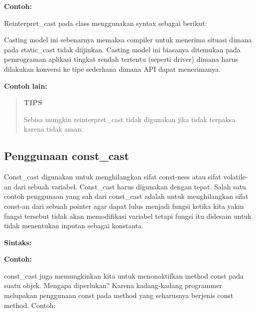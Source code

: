 

\textbf{Contoh:}



Reinterpret\_cast pada class menggunakan syntax sebagai berikut:



Casting model ini sebenarnya memaksa compiler untuk menerima situasi
dimana pada static\_cast tidak diijinkan. Casting model ini biasanya
ditemukan pada pemrograman aplikasi tingkat rendah tertentu (seperti
driver) dimana harus dilakukan konversi ke tipe sederhana dimana API
dapat menerimanya.



\textbf{Contoh lain:}



\begin{quotation}
{\LARGE {}} \textbf{TIPS}

Sebisa
mungkin reinterpret\_cast tidak digunakan jika tidak terpaksa karena
tidak aman.
\end{quotation}


\subsection{Penggunaan const\_cast}\label{penggunaan-constux5fcast}

Const\_cast digunakan untuk menghilangkan sifat const-ness atau sifat
volatile-an dari sebuah variabel. Const\_cast harus digunakan dengan
tepat. Salah satu contoh penggunaan yang sah dari const\_cast adalah
untuk menghilangkan sifat const-an dari sebuah pointer agar dapat lulus
menjadi fungsi ketika kita yakin fungsi tersebut tidak akan memodifikasi
variabel tetapi fungsi itu didesain untuk tidak menentukan inputan
sebagai konstanta.

\textbf{Sintaks:}



\textbf{Contoh:}



const\_cast juga memungkinkan kita untuk menonaktifkan method const pada
suatu objek. Mengapa diperlukan? Karena kadang-kadang programmer
melupakan penggunaan const pada method yang seharusnya berjenis const
method. Contoh:

